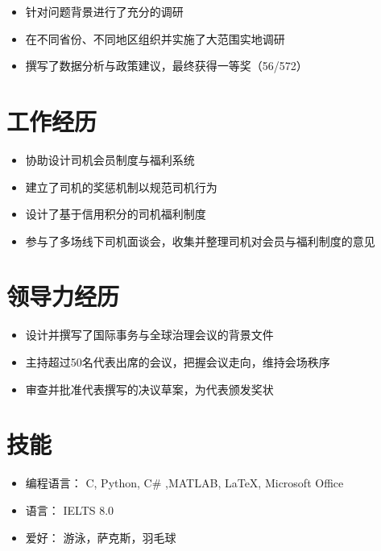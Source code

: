 \documentclass{resume}
\begin{document}
\begin{itemize}
  \item 针对问题背景进行了充分的调研
  \item 在不同省份、不同地区组织并实施了大范围实地调研
  \item 撰写了数据分析与政策建议，最终获得一等奖（56/572）
\end{itemize}

\section{工作经历}
\begin{itemize}
  \item 协助设计司机会员制度与福利系统
  \item 建立了司机的奖惩机制以规范司机行为
  \item 设计了基于信用积分的司机福利制度
  \item 参与了多场线下司机面谈会，收集并整理司机对会员与福利制度的意见
\end{itemize}


\section{领导力经历}


\begin{itemize}
  \item 设计并撰写了国际事务与全球治理会议的背景文件
  \item 主持超过50名代表出席的会议，把握会议走向，维持会场秩序
  \item 审查并批准代表撰写的决议草案，为代表颁发奖状
\end{itemize}

\section{技能}
\begin{itemize}[parsep=0.5ex]
  \item 编程语言： C, Python, C\# ,MATLAB, \LaTeX, Microsoft Office
  \item 语言： IELTS 8.0
  \item 爱好： 游泳，萨克斯，羽毛球 %
\end{itemize}
\end{document}

